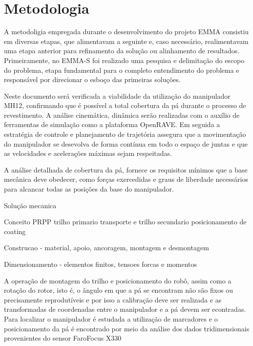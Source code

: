 \section{Metodologia}


A metodoligia empregada durante o desenvolvimento do projeto EMMA consistiu em
diversas etapas, que alimentavam a seguinte e, caso necessário,
realimentavam uma etapa anterior para refinamento da solução ou alinhamento de
resultados. Primeiramente, no EMMA-S foi realizado uma pesquisa e delimitação do
escopo do problema, etapa fundamental para o completo entendimento do problema e
responsável por direcionar o esboço das primeiras soluções. 

Neste documento será verificada a viabilidade da utilização do manipulador MH12,
confirmando que é possível a total cobertura da pá durante o processo de
revestimento. A análise cinemática, dinâmica serão realizadas com o auxílio de
ferramentas de simulação como a plataforma OpenRAVE. Em seguida a estratégia de
controle e planejamento de trajetória assegura que a movimentação do manipulador
se desevolva de forma contínua em todo o espaço de juntas e que as velocidades e
acelerações máximas sejam respeitadas.

A análise detalhada de cobertura da pá, fornece os requisitos mínimos que a base
mecânica deve obedecer, como forças exercedidas e graus de liberdade necessários
para alcancar todas as posições da base do manipulador. 





Solução mecanica

Conceito PRPP trilho primario transporte e trilho secundario posicionamento de
coating

Construcao - material, apoio, ancoragem, montagem e desmontagem

Dimensionamento - elementos finitos, tensoes forcas e momentos

A operação de montagem do trilho e posicionamento do robô, assim como
a rotação do rotor, isto é, o ângulo em que a pá se encontram não são fixos ou
precisamente reprodutíveis e por isso a calibração deve ser realizada e as
transformadas de coordenadas entre o manipulador e a pá devem ser econtradas.
Para localizar o manipulador é estudada a utilização de marcadores e o
posicionamento da pá é encontrado por meio da análise dos dados tridimensionais
provenientes do sensor Faro\textregistered Focus X330
